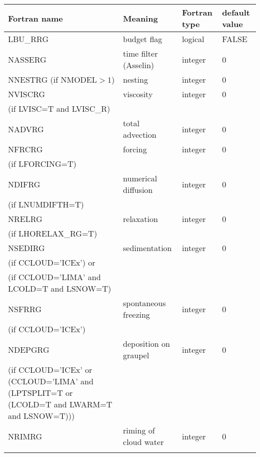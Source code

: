 \begin{longtable} {|p{}|p{}|>{\centering}p{}|p{}<{\centering}|}
\hline
Fortran name & Meaning & Fortran type & default value \\
\hline \hline
\endhead
LBU\_RRG & budget flag & logical & FALSE\index{LBU\_RRG!\innam{NAM\_BU\_RRG}} \\\hline
NASSERG  & time filter (Asselin)   & integer  &  0 \index{NASSERG!\innam{NAM\_BU\_RRG}} \\\hline
NNESTRG (if NMODEL$>1$) & nesting           & integer  &  0 \index{NNESTRG!\innam{NAM\_BU\_RRG}} \\\hline
NVISCRG  & viscosity         & integer  &  0 \index{NVISCRG!\innam{NAM\_BU\_RRG}}\\
(if LVISC=T and LVISC\_R) &  &   &   \\\hline
NADVRG   & total advection   & integer  &  0 \index{NADVRG!\innam{NAM\_BU\_RRG}}\\\hline
NFRCRG   & forcing           & integer  &  0 \index{NFRCRG!\innam{NAM\_BU\_RRG}} \\ \nopagebreak
(if LFORCING=T) &  &   &   \\\hline
NDIFRG   & numerical diffusion & integer  &  0 \index{NDIFRG!\innam{NAM\_BU\_RRG}} \\ \nopagebreak
(if LNUMDIFTH=T) &  &   &   \\\hline
NRELRG   & relaxation        & integer  &  0 \index{NRELRG!\innam{NAM\_BU\_RRG}}\\ \nopagebreak
(if LHORELAX\_RG=T) &  &   &   \\\hline
NSEDIRG  & sedimentation     & integer  &  0 \index{NSEDIRG!\innam{NAM\_BU\_RRG}}\\ \nopagebreak
(if CCLOUD='ICEx') or & &   &  \\ \nopagebreak
(if CCLOUD='LIMA' and LCOLD=T and LSNOW=T) & &   &  \\\hline
NSFRRG  & spontaneous freezing & integer  &  0 \index{NSFRRG!\innam{NAM\_BU\_RRG}}\\ \nopagebreak
(if CCLOUD='ICEx') & &   &  \\\hline
NDEPGRG  & deposition on graupel & integer  &  0 \index{NDEPGRG!\innam{NAM\_BU\_RRG}}\\ \nopagebreak
(if CCLOUD='ICEx' or (CCLOUD='LIMA' and (LPTSPLIT=T or (LCOLD=T and LWARM=T and LSNOW=T))) & & & \\\hline
NRIMRG   & riming of cloud water & integer  &  0 \index{NRIMRG!\innam{NAM\_BU\_RRG}}\\ \nopagebreak

\end{longtable}
